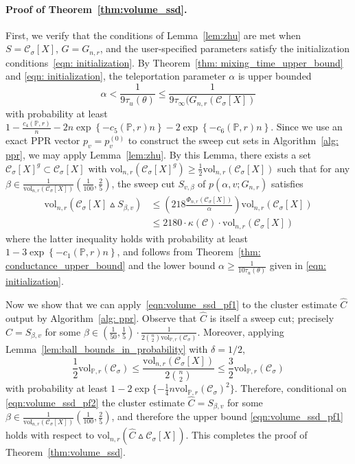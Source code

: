 \documentclass[11pt,twoside]{article}
\newcommand{\set}[1]{\left\{#1\right\}}
\newcommand{\vol}{\mathrm{vol}}
\newcommand{\1}{\mathbf{1}}
\newcommand{\Xbf}{X}             %
\newcommand{\Pbb}{\mathbb{P}}
\newcommand{\Cset}{\mathcal{C}}
\newcommand{\Csig}{\Cset_{\sigma}}
\newcommand{\Cest}{\widehat{C}}
\begin{document}
\paragraph{Proof of Theorem~\ref{thm:volume_ssd}.}
First, we verify that the conditions of Lemma~\ref{lem:zhu} are met when $S = \mathcal{C}_{\sigma}[\Xbf]$, $G = G_{n,r}$, and the user-specified parameters satisfy the initialization conditions~\eqref{eqn: initialization}. By Theorem~\ref{thm: mixing_time_upper_bound} and \eqref{eqn: initialization}, the teleportation parameter $\alpha$ is upper bounded
\begin{equation*}
\alpha < \frac{1}{9\tau_{u}(\theta)} \leq \frac{1}{9\tau_\infty(G_{n,r}(\Cset_{\sigma}[\Xbf])}
\end{equation*}
with probability at least $1 - \frac{c_4(\Pbb,r)}{n} - 2n\exp\set{-c_5(\Pbb,r)n} - 2\exp\set{-c_6(\Pbb,r)n}$. Since we use an exact PPR vector $p_v = p_v^{(0)}$ to construct the sweep cut sets in Algorithm~\ref{alg: ppr}, we may apply Lemma~\ref{lem:zhu}. By this Lemma, there exists a set $\Csig[\Xbf]^g \subset \Csig[\Xbf]$ with $\vol_{n,r}(\Csig[\Xbf]^g) \geq \frac{1}{2}\vol_{n,r}(\Csig[\Xbf])$ such that for any $\beta \in \frac{1}{\vol_{n,r}(\Csig[\Xbf])}(\frac{1}{100},\frac{2}{5})$, the sweep cut $S_{v,\beta}$ of $p(\alpha, v; G_{n,r})$ satisfies
\begin{align}
\vol_{n,r}(\Csig[\Xbf] \vartriangle S_{\beta,v}) & \leq \left(218\frac{\Phi_{n,r}(\Csig[\Xbf])}{\alpha}\right) \vol_{n,r}(\Csig[\Xbf]) \nonumber \\
& \leq 2180 \cdot\kappa(\Cset)\cdot\vol_{n,r}(\Csig[\Xbf]) \label{eqn:volume_ssd_pf1}
\end{align}
where the latter inequality holds with probability at least $1 - 3\exp\set{-c_1(\Pbb,r)n}$, and follows from Theorem~\ref{thm: conductance_upper_bound} and the lower bound $\alpha \geq \frac{1}{10 \tau_u(\theta)}$ given in \eqref{eqn: initialization}. 

Now we show that we can apply~\eqref{eqn:volume_ssd_pf1} to the cluster estimate $\Cest$ output by Algorithm~\ref{alg: ppr}. Observe that $\Cest$ is itself a sweep cut; precisely $\Cest = S_{\beta,v}$ for some $\beta \in \left(\frac{1}{50},\frac{1}{5}\right)\cdot\frac{1}{2{n \choose 2}\vol_{\Pbb,r}(\Csig)}$. Moreover, applying  Lemma~\ref{lem:ball_bounds_in_probability} with $\delta = 1/2$,
\begin{equation}
\label{eqn:volume_ssd_pf2}
\frac{1}{2}\vol_{\Pbb,r}(\Csig) \leq \frac{\vol_{n,r}(\Csig[\Xbf])}{2{n \choose 2}} \leq \frac{3}{2}\vol_{\Pbb,r}(\Csig)
\end{equation}
with probability at least $1 - 2\exp\{-\frac{1}{4} n \vol_{\Pbb,r}(\Csig)^2\}$. Therefore, conditional on \eqref{eqn:volume_ssd_pf2} the cluster estimate $\Cest = S_{\beta,v}$ for some $\beta \in \frac{1}{\vol_{n,r}(\Csig[\Xbf])}\left(\frac{1}{100},\frac{2}{5}\right)$, and therefore the upper bound \eqref{eqn:volume_ssd_pf1} holds with respect to $\vol_{n,r}(\widehat{C} \vartriangle \Csig[\Xbf])$. This completes the proof of Theorem~\ref{thm:volume_ssd}.
\end{document}
